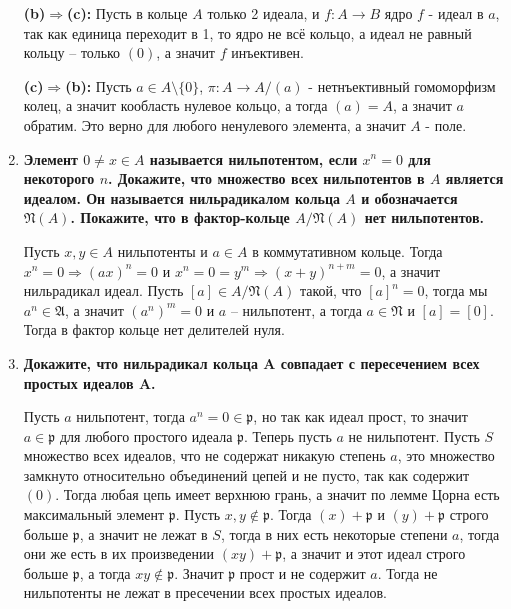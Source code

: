 \documentclass{article}
\begin{document}
\begin{enumerate}
        \textbf{(b)$\Rightarrow$(c):} Пусть в кольце $A$ только 2 идеала, и
        $f:A\rightarrow B$ ядро $f$ - идеал в $a$, так как единица переходит в 1,
        то ядро не всё кольцо, а идеал не равный кольцу – только $(0)$, а значит
        $f$ инъективен.

        \textbf{(c)$\Rightarrow$(b):} Пусть $a\in A\setminus\{0\}$,
        $\pi:A\longrightarrow A/(a)$ - нетнъективный гомоморфизм колец, а
        значит кообласть нулевое кольцо, а тогда $(a)=A$, а значит $a$ обратим.
        Это верно для любого ненулевого элемента, а значит $A$ - поле.

    \item \textbf{Элемент $0\neq x\in A$ называется нильпотентом, если $x^n=0$
        для некоторого $n$. Докажите, что множество всех нильпотентов в $A$
        является идеалом. Он называется нильрадикалом кольца $A$ и обозначается
        $\mathfrak{N}(A)$. Покажите, что в фактор-кольце $A/\mathfrak{N}(A)$ нет
        нильпотентов.}
        
        Пусть $x,y\in A$ нильпотенты и $a\in A$ в коммутативном кольце. Тогда
        $x^n=0\Rightarrow(ax)^n=0$ и $x^n=0=y^m\Rightarrow(x+y)^{n+m}=0$, а
        значит нильрадикал идеал. Пусть $[a]\in A/\mathfrak{N}(A)$ такой, что
        $[a]^n=0$, тогда мы $a^n\in\mathfrak{A}$, а значит $(a^n)^m=0$ и $a$ –
        нильпотент, а тогда $a\in\mathfrak{N}$ и $[a]=[0]$. Тогда в фактор
        кольце нет делителей нуля.

    \item \textbf{Докажите, что нильрадикал кольца A совпадает с пересечением
        всех простых идеалов A.}

        Пусть $a$ нильпотент, тогда $a^n=0\in\mathfrak{p}$, но так как идеал
        прост, то значит $a\in\mathfrak{p}$ для любого простого идеала
        $\mathfrak{p}$. Теперь пусть $a$ не нильпотент. Пусть $S$ множество
        всех идеалов, что не содержат никакую степень $a$, это множество
        замкнуто относительно объединений цепей и не пусто, так как содержит
        $(0)$. Тогда любая цепь имеет верхнюю грань, а значит по лемме Цорна
        есть максимальный элемент $\mathfrak{p}$. Пусть $x,y\notin\mathfrak{p}$.
        Тогда $(x)+\mathfrak{p}$ и $(y)+\mathfrak{p}$ строго больше $\mathfrak{p}$,
        а значит не лежат в $S$, тогда в них есть некоторые степени $a$, тогда
        они же есть в их произведении $(xy)+\mathfrak{p}$, а значит и этот идеал
        строго больше $\mathfrak{p}$, а тогда $xy\notin\mathfrak{p}$. Значит
        $\mathfrak{p}$ прост и не содержит $a$. Тогда не нильпотенты не лежат
        в пресечении всех простых идеалов.


\end{enumerate}
\end{document}
